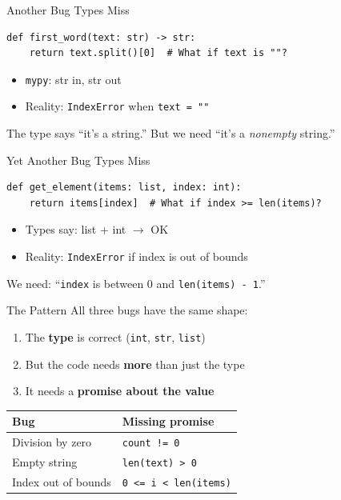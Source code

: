\documentclass[aspectratio=169,10pt]{beamer}
\begin{document}
\begin{frame}[fragile]{Another Bug Types Miss}
\begin{lstlisting}
def first_word(text: str) -> str:
    return text.split()[0]  # What if text is ""?
\end{lstlisting}
\vspace{0.3em}
\begin{itemize}
  \item \texttt{mypy}: \textcolor{safe}{\checkmark} str in, str out
  \item Reality: \textcolor{danger}{\texttimes} \texttt{IndexError} when \texttt{text = ""}
\end{itemize}
\vspace{0.3em}
The type says ``it's a string.'' But we need ``it's a \emph{nonempty} string.''
\end{frame}

\begin{frame}[fragile]{Yet Another Bug Types Miss}
\begin{lstlisting}
def get_element(items: list, index: int):
    return items[index]  # What if index >= len(items)?
\end{lstlisting}
\vspace{0.3em}
\begin{itemize}
  \item Types say: list + int $\to$ OK
  \item Reality: \texttt{IndexError} if index is out of bounds
\end{itemize}
We need: ``\texttt{index} is between 0 and \texttt{len(items) - 1}.''
\end{frame}

\begin{frame}{The Pattern}
All three bugs have the same shape:
\vspace{0.3em}
\begin{enumerate}
  \item The \textbf{type} is correct (\texttt{int}, \texttt{str}, \texttt{list})
  \item But the code needs \textbf{more} than just the type
  \item It needs a \textbf{promise about the value}
\end{enumerate}
\vspace{0.5em}
\begin{center}
\begin{tabular}{ll}
\textbf{Bug} & \textbf{Missing promise} \\
\hline
Division by zero   & \texttt{count != 0} \\
Empty string       & \texttt{len(text) > 0} \\
Index out of bounds & \texttt{0 <= i < len(items)} \\
\end{tabular}
\end{center}
\end{frame}
\end{document}
